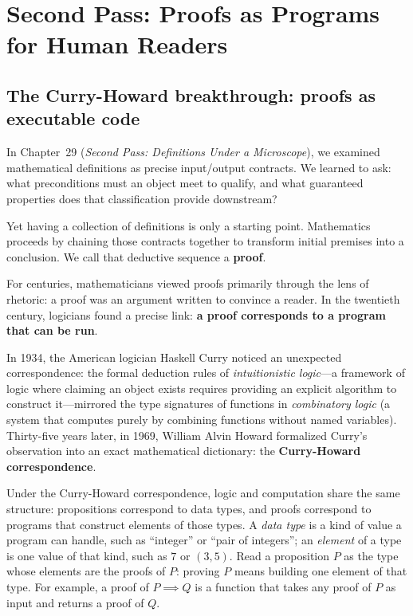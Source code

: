 \section{Second Pass: Proofs as Programs for Human Readers}
\chapterline

\subsection{The Curry-Howard breakthrough: proofs as executable code}

In Chapter~29 (\emph{Second Pass: Definitions Under a Microscope}), we examined mathematical definitions as precise input/output contracts. We learned to ask: what preconditions must an object meet to qualify, and what guaranteed properties does that classification provide downstream?

Yet having a collection of definitions is only a starting point. Mathematics proceeds by chaining those contracts together to transform initial premises into a conclusion. We call that deductive sequence a \textbf{proof}.

For centuries, mathematicians viewed proofs primarily through the lens of rhetoric: a proof was an argument written to convince a reader. In the twentieth century, logicians found a precise link: \textbf{a proof corresponds to a program that can be run}.

In 1934, the American logician Haskell Curry noticed an unexpected correspondence: the formal deduction rules of \emph{intuitionistic logic}---a framework of logic where claiming an object exists requires providing an explicit algorithm to construct it---mirrored the type signatures of functions in \emph{combinatory logic} (a system that computes purely by combining functions without named variables). Thirty-five years later, in 1969, William Alvin Howard formalized Curry's observation into an exact mathematical dictionary: the \textbf{Curry-Howard correspondence}.

Under the Curry-Howard correspondence, logic and computation share the same structure: propositions correspond to data types, and proofs correspond to programs that construct elements of those types. A \emph{data type} is a kind of value a program can handle, such as ``integer'' or ``pair of integers''; an \emph{element} of a type is one value of that kind, such as $7$ or $(3, 5)$. Read a proposition $P$ as the type whose elements are the proofs of $P$: proving $P$ means building one element of that type. For example, a proof of $P \implies Q$ is a function that takes any proof of $P$ as input and returns a proof of $Q$.

